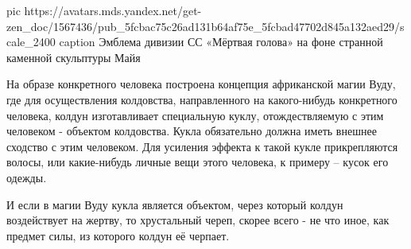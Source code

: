 \ifcmt
  pic https://avatars.mds.yandex.net/get-zen_doc/1567436/pub_5fcbac75c26ad131b64af75e_5fcbad47702d845a132aed29/scale_2400
  caption Эмблема дивизии СС «Мёртвая голова» на фоне странной каменной скульптуры Майя
\fi

На образе конкретного человека построена концепция африканской магии Вуду, где
для осуществления колдовства, направленного на какого-нибудь конкретного
человека, колдун изготавливает специальную куклу, отождествляемую с этим
человеком - объектом колдовства. Кукла обязательно должна иметь внешнее
сходство с этим человеком. Для усиления эффекта к такой кукле прикрепляются
волосы, или какие-нибудь личные вещи этого человека, к примеру – кусок его
одежды.

И если в магии Вуду кукла является объектом, через который колдун воздействует
на жертву, то хрустальный череп, скорее всего - не что иное, как предмет силы,
из которого колдун её черпает.

